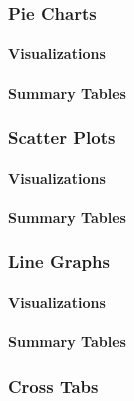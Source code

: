 \documentclass[
]{book}
\begin{document}
\hypertarget{pie-charts}{%
\subsubsection{Pie Charts}\label{pie-charts}}

\hypertarget{visualizations-3}{%
\paragraph{Visualizations}\label{visualizations-3}}

\hypertarget{summary-tables-3}{%
\paragraph{Summary Tables}\label{summary-tables-3}}

\hypertarget{scatter-plots}{%
\subsubsection{Scatter Plots}\label{scatter-plots}}

\hypertarget{visualizations-4}{%
\paragraph{Visualizations}\label{visualizations-4}}

\hypertarget{summary-tables-4}{%
\paragraph{Summary Tables}\label{summary-tables-4}}

\hypertarget{line-graphs}{%
\subsubsection{Line Graphs}\label{line-graphs}}

\hypertarget{visualizations-5}{%
\paragraph{Visualizations}\label{visualizations-5}}

\hypertarget{summary-tables-5}{%
\paragraph{Summary Tables}\label{summary-tables-5}}

\hypertarget{cross-tabs}{%
\subsubsection{Cross Tabs}\label{cross-tabs}}
\end{document}
